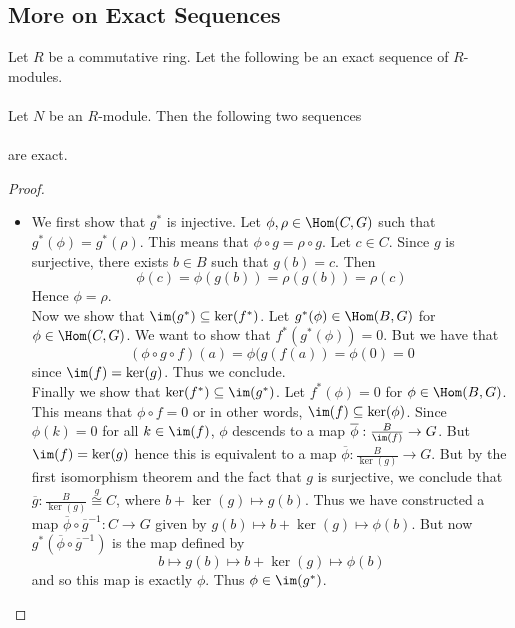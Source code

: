 \documentclass[a4paper]{article}
\begin{document}
\subsection{More on Exact Sequences}
\begin{prp}{}{} Let $R$ be a commutative ring. Let the following be an exact sequence of $R$-modules. \\
\\ Let $N$ be an $R$-module. Then the following two sequences \\
 \\ 
are exact. 
\begin{proof}\\
\begin{itemize}
\item We first show that $g^\ast$ is injective. Let $\phi,\rho\in\Hom(C,G)$ such that $g^\ast(\phi)=g^\ast(\rho)$. This means that $\phi\circ g=\rho\circ g$. Let $c\in C$. Since $g$ is surjective, there exists $b\in B$ such that $g(b)=c$. Then $$\phi(c)=\phi(g(b))=\rho(g(b))=\rho(c)$$ Hence $\phi=\rho$. \\

Now we show that $\im(g^\ast)\subseteq\ker(f^\ast)$. Let $g^\ast(\phi)\in\Hom(B,G)$ for $\phi\in\Hom(C,G)$. We want to show that $f^\ast(g^\ast(\phi))=0$. But we have that $$(\phi\circ g\circ f)(a)=\phi(g(f(a))=\phi(0)=0$$ since $\im(f)=\ker(g)$. Thus we conclude. \\

Finally we show that $\ker(f^\ast)\subseteq\im(g^\ast)$. Let $f^\ast(\phi)=0$ for $\phi\in\Hom(B,G)$. This means that $\phi\circ f=0$ or in other words, $\im(f)\subseteq\ker(\phi)$.
Since $\phi(k)=0$ for all $k\in\im(f)$, $\phi$ descends to a map $\overline{\phi}:\frac{B}{\im(f)}\to G$. But $\im(f)=\ker(g)$ hence this is equivalent to a map $\overline{\phi}:\frac{B}{\ker(g)}\to G$. But by the first isomorphism theorem and the fact that $g$ is surjective, we conclude that $\overline{g}:\frac{B}{\ker(g)}\overset{g}{\cong} C$, where $b+\ker(g)\mapsto g(b)$. Thus we have constructed a map $\overline{\phi}\circ\overline{g}^{-1}:C\to G$ given by $g(b)\mapsto b+\ker(g)\mapsto\phi(b)$. But now $g^\ast(\overline{\phi}\circ\overline{g}^{-1})$ is the map defined by $$b\mapsto g(b)\mapsto b+\ker(g)\mapsto\phi(b)$$ and so this map is exactly $\phi$. Thus $\phi\in\im(g^\ast)$. 
\end{itemize}
\end{proof}
\end{prp}
\end{document}

